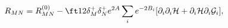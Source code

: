\begin{equation}
R_{MN}=R_{MN}^{(0)}-\ft12\delta_M^+\delta_N^+e^{2A}\sum_ie^{-2B_i}
[\partial_i\partial_i{\cal H}+\partial_i{\cal H}\partial_i{\cal G}_i],
\label{ricci}
\end{equation}

